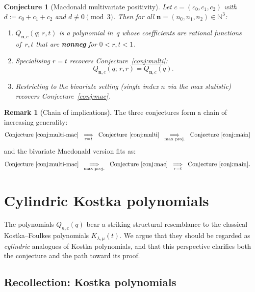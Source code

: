 \documentclass[11pt]{article}
\theoremstyle{plain}
\newtheorem{conjecture}[theorem]{Conjecture}
\theoremstyle{definition}
\newtheorem{remark}[theorem]{Remark}
\newcommand{\N}{\mathbb{N}}
\begin{document}
\begin{conjecture}[Macdonald multivariate positivity]
\label{conj:multi-mac}
Let $c = (c_0, c_1, c_2)$ with $d := c_0 + c_1 + c_2$ and
$d \not\equiv 0 \pmod{3}$.  Then for all
$\mathbf{n} = (n_0, n_1, n_2) \in \N^3$:
\begin{enumerate}
  \item[(i)] $Q_{\mathbf{n},c}(q;\,r,t)$ is a polynomial in~$q$
    whose coefficients are rational functions of~$r,t$ that are
    \textbf{nonneg} for $0 < r, t < 1$.
  \item[(ii)] Specialising $r = t$ recovers
    Conjecture~\ref{conj:multi}:
    \[
      Q_{\mathbf{n},c}(q;\,r,r)
      = Q_{\mathbf{n},c}(q).
    \]
  \item[(iii)] Restricting to the bivariate setting (single index
    $n$ via the max statistic) recovers
    Conjecture~\ref{conj:mac}.
\end{enumerate}
\end{conjecture}

\begin{remark}[Chain of implications]
The three conjectures form a chain of increasing generality:
\[
  \text{Conjecture~\ref{conj:multi-mac}}
  \;\;\underset{r=t}{\Longrightarrow}\;\;
  \text{Conjecture~\ref{conj:multi}}
  \;\;\underset{\text{max proj.}}{\Longrightarrow}\;\;
  \text{Conjecture~\ref{conj:main}}
\]
and the bivariate Macdonald version fits as:
\[
  \text{Conjecture~\ref{conj:multi-mac}}
  \;\;\underset{\text{max proj.}}{\Longrightarrow}\;\;
  \text{Conjecture~\ref{conj:mac}}
  \;\;\underset{r=t}{\Longrightarrow}\;\;
  \text{Conjecture~\ref{conj:main}}.
\]
\end{remark}


\section{Cylindric Kostka polynomials}
\label{sec:cyl-kostka}

The polynomials $Q_{n,c}(q)$ bear a striking structural resemblance to
the classical Kostka--Foulkes polynomials $K_{\lambda,\mu}(t)$.
We argue that they should be regarded as \emph{cylindric} analogues
of Kostka polynomials, and that this perspective clarifies both
the conjecture and the path toward its proof.

\subsection{Recollection: Kostka polynomials}
\end{document}
